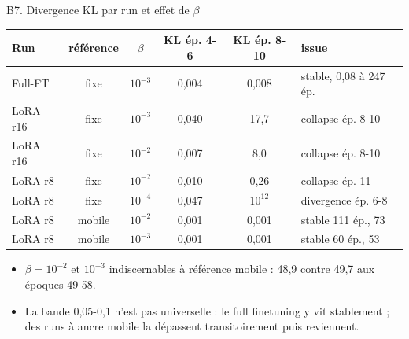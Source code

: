 \documentclass[aspectratio=169,10pt]{beamer}
\begin{document}
\begin{frame}{B7. Divergence KL par run et effet de $\beta$}
\scriptsize
\begin{tabular}{@{}lccccl@{}}
\toprule
Run & référence & $\beta$ & KL ép. 4-6 & KL ép. 8-10 & issue \\
\midrule
Full-FT & fixe & $10^{-3}$ & 0,004 & 0,008 & stable, 0,08 à 247 ép. \\
LoRA r16 & fixe & $10^{-3}$ & 0,040 & 17,7 & collapse ép. 8-10 \\
LoRA r16 & fixe & $10^{-2}$ & 0,007 & 8,0 & collapse ép. 8-10 \\
LoRA r8 & fixe & $10^{-2}$ & 0,010 & 0,26 & collapse ép. 11 \\
LoRA r8 & fixe & $10^{-4}$ & 0,047 & $10^{12}$ & divergence ép. 6-8 \\
LoRA r8 & mobile & $10^{-2}$ & 0,001 & 0,001 & stable 111 ép., 73 \\
LoRA r8 & mobile & $10^{-3}$ & 0,001 & 0,001 & stable 60 ép., 53 \\
\bottomrule
\end{tabular}
\vspace{0.3cm}
\small
\begin{itemize}
  \item $\beta=10^{-2}$ et $10^{-3}$ indiscernables à référence mobile : 48,9 contre 49,7 aux époques 49-58.
  \item La bande 0,05-0,1 n'est pas universelle : le full finetuning y vit stablement ; des runs à ancre mobile la dépassent transitoirement puis reviennent.
\end{itemize}
\end{frame}
\end{document}
